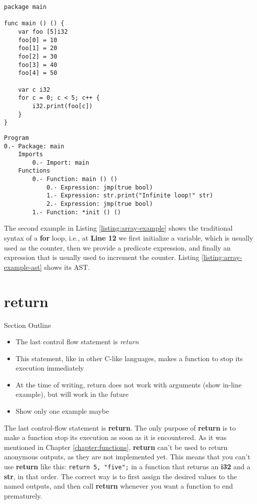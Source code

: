 \documentclass[11pt,fleqn,openany]{book} %
\begin{document}
\begin{lstlisting}[caption={Traditional Syntax of For Loop},captionpos=b,label={listing:array-example}]
package main

func main () () {
	var foo [5]i32
	foo[0] = 10
	foo[1] = 20
	foo[2] = 30
	foo[3] = 40
	foo[4] = 50

	var c i32
	for c = 0; c < 5; c++ {
		i32.print(foo[c])
	}
}
\end{lstlisting}

\begin{lstlisting}[caption={Listing \ref{listing:array-example}'s Abstract Syntax Tree},captionpos=b,label={listing:array-example-ast}]
Program
0.- Package: main
	Imports
		0.- Import: main
	Functions
		0.- Function: main () ()
			0.- Expression: jmp(true bool)
			1.- Expression: str.print("Infinite loop!" str)
			2.- Expression: jmp(true bool)
		1.- Function: *init () ()
\end{lstlisting}

The second example in Listing \ref{listing:array-example} shows the traditional syntax of a \textbf{for} loop, i.e., at \textbf{Line 12} we first initialize a variable, which is usually used as the counter, then we provide a predicate expression, and finally an expression that is usually used to increment the counter. Listing \ref{listing:array-example-ast} shows its AST.

\section{return}

\begin{remark}
Section Outline
    \begin{itemize}
    	\item The last control flow statement is \textit{return}
        \item This statement, like in other C-like languages, makes a function to stop its execution immediately
        \item At the time of writing, return does not work with arguments (show in-line example), but will work in the future
        \item Show only one example maybe
    \end{itemize}
\end{remark}

The last control-flow statement is \textbf{return}. The only purpose of \textbf{return} is to make a function stop its execution as soon as it is encountered. As it was mentioned in Chapter \ref{chapter:functions}, \textbf{return} can't be used to return anonymous outputs, as they are not implemented yet. This means that you can't use \textbf{return} like this: \lstinline{return 5, "five";} in a function that returns an \textbf{i32} and a \textbf{str}, in that order. The correct way is to first assign the desired values to the named outputs, and then call \textbf{return} whenever you want a function to end prematurely.
\end{document}
